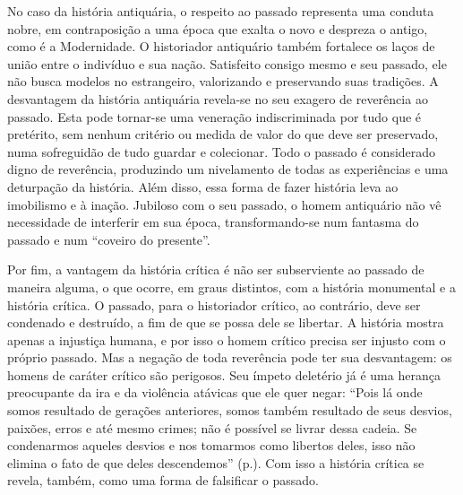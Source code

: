 No caso da história antiquária, o respeito ao passado representa uma
conduta nobre, em contraposição a uma época que exalta o novo e despreza
o antigo, como é a Modernidade. O historiador antiquário também
fortalece os laços de união entre o indivíduo e sua nação. Satisfeito
consigo mesmo e seu passado, ele não busca modelos no estrangeiro,
valorizando e preservando suas tradições. A desvantagem da história
antiquária revela-se no seu exagero de reverência ao passado. Esta pode
tornar-se uma veneração indiscriminada por tudo que é pretérito, sem
nenhum critério ou medida de valor do que deve ser preservado, numa
sofreguidão de tudo guardar e colecionar. Todo o passado é considerado
digno de reverência, produzindo um nivelamento de todas as experiências
e uma deturpação da história. Além disso, essa forma de fazer história
leva ao imobilismo e à inação. Jubiloso com o seu passado, o homem
antiquário não vê necessidade de interferir em sua época,
transformando-se num fantasma do passado e num ``coveiro do presente''.

Por fim, a vantagem da história crítica é não ser subserviente ao
passado de maneira alguma, o que ocorre, em graus distintos, com a
história monumental e a história crítica. O passado, para o historiador
crítico, ao contrário, deve ser condenado e destruído, a fim de que se
possa dele se libertar. A história mostra apenas a injustiça humana, e
por isso o homem crítico precisa ser injusto com o próprio passado. Mas
a negação de toda reverência pode ter sua desvantagem: os homens de
caráter crítico são perigosos. Seu ímpeto deletério já é uma herança
preocupante da ira e da violência atávicas que ele quer negar: ``Pois lá
onde somos resultado de gerações anteriores, somos também resultado de
seus desvios, paixões, erros e até mesmo crimes; não é possível se
livrar dessa cadeia. Se condenarmos aqueles desvios e nos tomarmos como
libertos deles, isso não elimina o fato de que deles descendemos'' (p.).
Com isso a história crítica se revela, também, como uma forma de
falsificar o passado.

